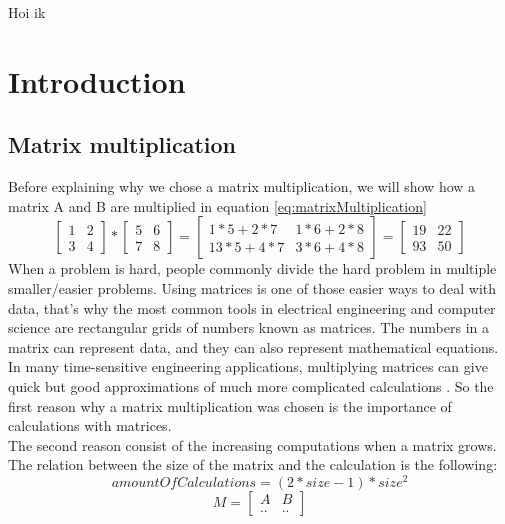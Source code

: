 Hoi ik 

\section{Introduction}
	\subsection{Matrix multiplication}
Before explaining why we chose a matrix multiplication, we will show how a matrix A and B are multiplied in equation \ref{eq:matrixMultiplication}
\begin{equation} \label{eq:matrixMultiplication}
	 \begin{bmatrix}
	1 & 2 \\[0.2em]
	3 & 4
	\end{bmatrix}
	*
	 \begin{bmatrix}
	5 & 6 \\[0.2em]
	7 & 8
	\end{bmatrix}
	=
	 \begin{bmatrix}
	1*5+2*7 & 1*6+2*8 \\[0.2em]
	13*5+4*7 & 3*6+4*8
	\end{bmatrix}
	=
	 \begin{bmatrix}
	19 & 22 \\[0.2em]
	93 & 50
	\end{bmatrix}
\end{equation}
When a problem is hard, people commonly divide the hard problem in multiple smaller/easier problems. Using matrices is one of those easier ways to deal with data, that's why the most common tools in electrical engineering and computer science are rectangular grids of numbers known as matrices. The numbers in a matrix can represent data, and they can also represent mathematical equations. In many time-sensitive engineering applications, multiplying matrices can give quick but good approximations of much more complicated calculations \cite{Hardesty2013}. So the first reason why a matrix multiplication was chosen is the importance of calculations with matrices.\\
The second reason consist of the increasing computations when a matrix grows. The relation between the size of the matrix and the calculation is the following:
\begin{equation} \label{eq:1}
amountOfCalculations = (2*size-1)*size^2
\end{equation}
\begin{equation}
	M =	\begin{bmatrix}
	A & B \\[0.2em]
	.. & ..
	\end{bmatrix}
\end{equation}
